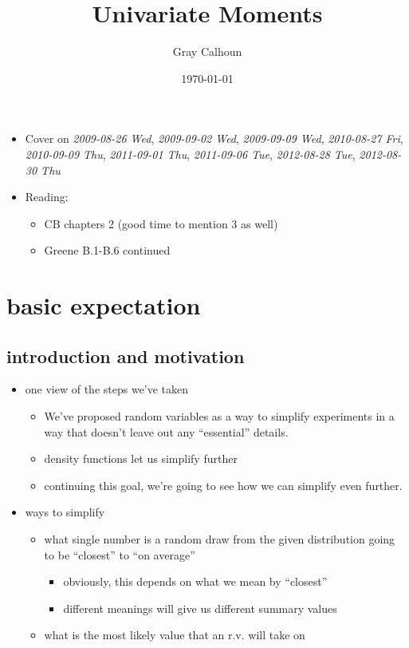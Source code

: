 \documentclass[11pt]{article}
\title{Univariate Moments}
\author{Gray Calhoun}
\date{\today}
\begin{document}
\maketitle

\setcounter{tocdepth}{2}
\tableofcontents
\vspace*{1cm}
\begin{itemize}
\item Cover on \textit{2009-08-26 Wed}, \textit{2009-09-02 Wed}, \textit{2009-09-09 Wed},
     \textit{2010-08-27 Fri}, \textit{2010-09-09 Thu}, \textit{2011-09-01 Thu}, 
     \textit{2011-09-06 Tue}, \textit{2012-08-28 Tue}, \textit{2012-08-30 Thu}
\item Reading:
\begin{itemize}
\item CB chapters 2 (good time to mention 3 as well)
\item Greene B.1-B.6 continued
\end{itemize}
\end{itemize}
\section{basic expectation}
\label{sec-1}
\subsection{introduction and motivation}
\label{sec-1-1}

\begin{itemize}
\item one view of the steps we've taken
\begin{itemize}
\item We've proposed random variables as a way to simplify experiments
         in a way that doesn't leave out any ``essential'' details.
\item density functions let us simplify further
\item continuing this goal, we're going to see how we can simplify even further.
\end{itemize}
\item ways to simplify
\begin{itemize}
\item what single number is a random draw from the given distribution
         going to be ``closest'' to ``on average''
\begin{itemize}
\item obviously, this depends on what we mean by ``closest''
\item different meanings will give us different summary values
\end{itemize}
\item what is the most likely value that an r.v. will take on
\end{itemize}
\end{itemize}
\end{document}
